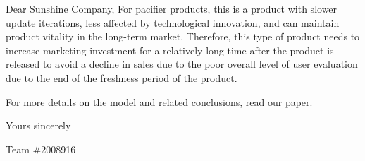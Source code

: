 \documentclass{mcmthesis}
\begin{document}
\begin{letter}{Dear Sunshine Company, }
     For pacifier products, this is a product with slower update iterations, less affected by technological innovation, and can maintain product vitality in the long-term market. Therefore, this type of product needs to increase marketing investment for a relatively long time after the product is released to avoid a decline in sales due to the poor overall level of user evaluation due to the end of the freshness period of the product.
    
    
    
    
    
    For more details on the model and related conclusions, read our paper.
    
        \vspace{\parskip}

        Yours sincerely 
        
        Team \#2008916

    \end{letter}
    
\end{document}

